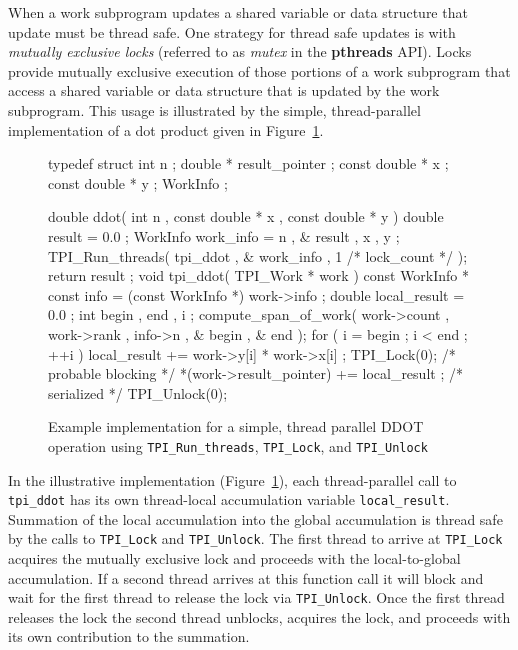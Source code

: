 When a work subprogram updates a shared variable or data structure that update must be thread safe.
%
One strategy for thread safe updates is with \emph{mutually exclusive locks} 
(referred to as \emph{mutex} in the \textbf{pthreads} API).
%
Locks provide mutually exclusive execution of those portions of a work subprogram that access a shared variable or data structure that is updated by the work subprogram.
%
This usage is illustrated by the simple, thread-parallel implementation of a dot product given in Figure~\ref{fig:WorkSubprogramDDOTlocking}.

\begin{figure}[h]
\small
\center
\begin{boxedverbatim}
typedef struct {
  int n ;
  double * result_pointer ;
  const double * x ;
  const double * y ;
} WorkInfo ;

double ddot( int n , const double * x , const double * y )
{
  double result = 0.0 ;
  WorkInfo work_info = { n , & result , x , y };
  TPI_Run_threads( tpi_ddot , & work_info , 1 /* lock_count */ );
  return result ;
}
void tpi_ddot( TPI_Work * work )
{
  const WorkInfo * const info = (const WorkInfo *) work->info ;
  double local_result = 0.0 ;
  int begin , end , i ;
  compute_span_of_work( work->count , work->rank , info->n , & begin , & end );
  for ( i = begin ; i < end ; ++i ) { 
    local_result += work->y[i] * work->x[i] ; 
  }
  TPI_Lock(0);                              /* probable blocking */
  *(work->result_pointer) += local_result ; /* serialized */
  TPI_Unlock(0);
}
\end{boxedverbatim}
\caption{Example implementation for a simple, thread parallel DDOT operation using \texttt{TPI\_Run\_threads}, \texttt{TPI\_Lock}, and \texttt{TPI\_Unlock}}
\label{fig:WorkSubprogramDDOTlocking}
\end{figure}

In the illustrative implementation (Figure~\ref{fig:WorkSubprogramDDOTlocking}), each thread-parallel call to \texttt{tpi\_ddot} has its own thread-local accumulation variable \texttt{local\_result}.
%
Summation of the local accumulation into the global accumulation is thread safe by the calls to \texttt{TPI\_Lock} and \texttt{TPI\_Unlock}.
%
The first thread to arrive at \texttt{TPI\_Lock} acquires the mutually exclusive lock and proceeds with the local-to-global accumulation.
%
If a second thread arrives at this function call it will block and wait for the first thread to release the lock via \texttt{TPI\_Unlock}.
%
Once the first thread releases the lock the second thread unblocks, acquires the lock, and proceeds with its own contribution to the summation.


